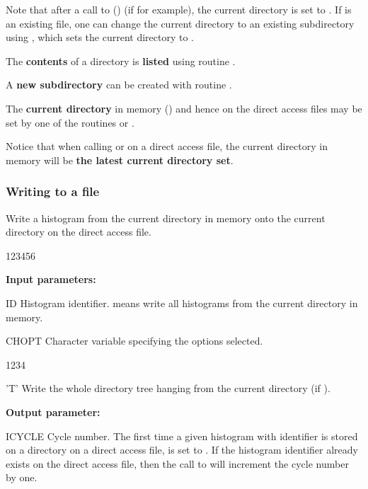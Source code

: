 Note that after a call to  () 
(if  for example),
the current directory is set to .
If  is an existing file, one can change the current directory
to an existing subdirectory  using
, which
sets the current directory  to .
 
\begin{UL}
    \item The {\bf contents} of a directory is
        {\bf listed} using routine .
    \item A {\bf new subdirectory} can be created with routine .
    \item The {\bf current directory} in memory ()
        and hence on the direct access files may be set by one of the routines
         or .
\end{UL}

Notice that when calling  or  on a 
direct access file, the current directory in memory will be 
{\bf the latest current directory set}.
 
\subsubsection*{Writing to a file}
\label{HWRITFIL} 

 
\Action
Write a  histogram from the current directory in memory
onto the current directory on the direct access file.
 
\begin{DLtt}{123456}
\item[{\rm\bf Input parameters:}]
\item[ID] Histogram identifier.
           means write all histograms from the current directory in
          memory.
\item[CHOPT] Character variable specifying the options selected.
\begin{DLtt}{1234}
\item['T'] Write the whole directory tree hanging from the current
           directory (if ).
\end{DLtt}
\item[{\rm\bf Output parameter:}]
\item[ICYCLE]
Cycle number. The first time a given histogram with identifier 
is stored on a directory on a direct access file,
 is set to .
If the histogram identifier  already exists on the direct access
file, then the call to  will increment the cycle number
 by one.
\end{DLtt}
 
